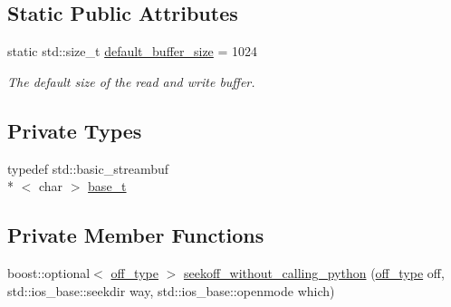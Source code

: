 \subsection*{Static Public Attributes}
\begin{DoxyCompactItemize}
\item 
static std\-::size\-\_\-t \hyperlink{classecto_1_1py_1_1streambuf_a7a20a01fb9aeda8677b3c65bccd6b59d}{default\-\_\-buffer\-\_\-size} = 1024
\begin{DoxyCompactList}\small\item\em The default size of the read and write buffer. \end{DoxyCompactList}\end{DoxyCompactItemize}
\subsection*{Private Types}
\begin{DoxyCompactItemize}
\item 
typedef std\-::basic\-\_\-streambuf\\*
$<$ char $>$ \hyperlink{classecto_1_1py_1_1streambuf_ac46c69e7d213fec69f80d1943389366c}{base\-\_\-t}
\end{DoxyCompactItemize}
\subsection*{Private Member Functions}
\begin{DoxyCompactItemize}
\item 
boost\-::optional$<$ \hyperlink{classecto_1_1py_1_1streambuf_aa01772d1599fc51089a209a69fcab7c7}{off\-\_\-type} $>$ \hyperlink{classecto_1_1py_1_1streambuf_a367a7e20642d4a3ebcefd2f6abc3c3e6}{seekoff\-\_\-without\-\_\-calling\-\_\-python} (\hyperlink{classecto_1_1py_1_1streambuf_aa01772d1599fc51089a209a69fcab7c7}{off\-\_\-type} off, std\-::ios\-\_\-base\-::seekdir way, std\-::ios\-\_\-base\-::openmode which)
\end{DoxyCompactItemize}
